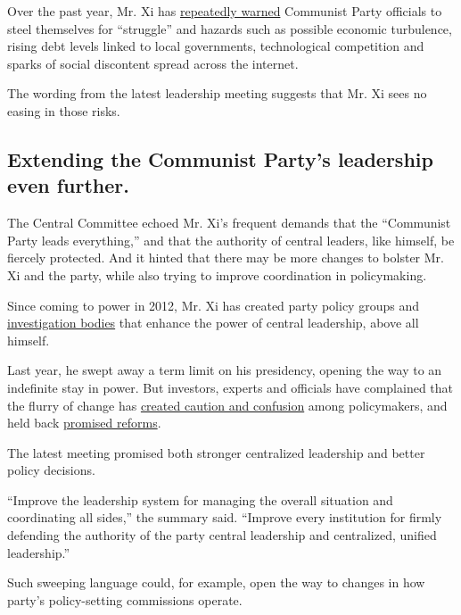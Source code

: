 Over the past year, Mr. Xi has
\href{https://www.nytimes3xbfgragh.onion/2019/02/25/world/asia/china-xi-warnings.html}{repeatedly
warned} Communist Party officials to steel themselves for ``struggle''
and hazards such as possible economic turbulence, rising debt levels
linked to local governments, technological competition and sparks of
social discontent spread across the internet.

The wording from the latest leadership meeting suggests that Mr. Xi sees
no easing in those risks.

\hypertarget{extending-the-communist-partys-leadership-even-further}{%
\subsection{Extending the Communist Party's leadership even
further.}\label{extending-the-communist-partys-leadership-even-further}}

The Central Committee echoed Mr. Xi's frequent demands that the
``Communist Party leads everything,'' and that the authority of central
leaders, like himself, be fiercely protected. And it hinted that there
may be more changes to bolster Mr. Xi and the party, while also trying
to improve coordination in policymaking.

Since coming to power in 2012, Mr. Xi has created party policy groups
and
\href{https://www.nytimes3xbfgragh.onion/2017/11/29/world/asia/china-xi-jinping-anticorruption.html}{investigation
bodies} that enhance the power of central leadership, above all himself.

Last year, he swept away a term limit on his presidency, opening the way
to an indefinite stay in power. But investors, experts and officials
have complained that the flurry of change has
\href{https://www.nytimes3xbfgragh.onion/2017/03/04/world/asia/china-xi-jinping-economic-reform.html}{created
caution and confusion} among policymakers, and held back
\href{https://www.nytimes3xbfgragh.onion/2017/03/27/business/chinese-economy-reform-critical-report.html}{promised
reforms}.

The latest meeting promised both stronger centralized leadership and
better policy decisions.

``Improve the leadership system for managing the overall situation and
coordinating all sides,'' the summary said. ``Improve every institution
for firmly defending the authority of the party central leadership and
centralized, unified leadership.''

Such sweeping language could, for example, open the way to changes in
how party's policy-setting commissions operate.

